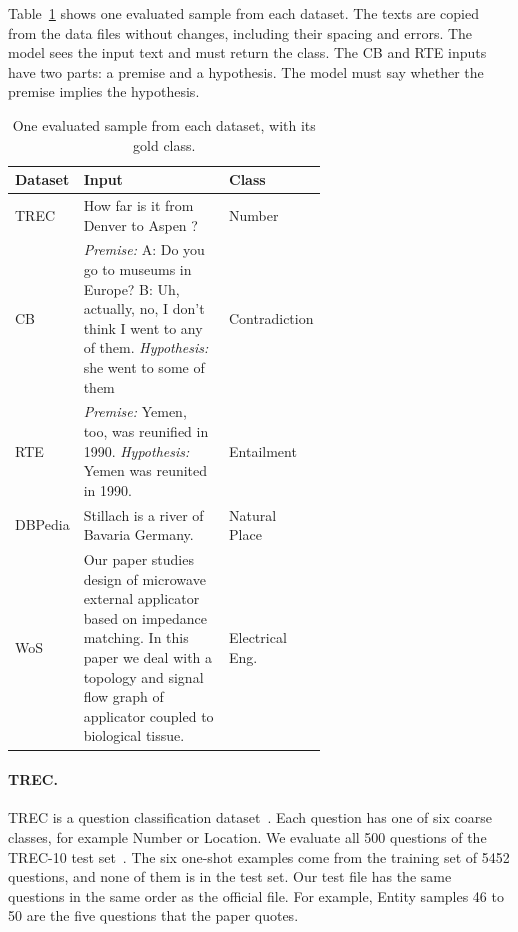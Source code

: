 Table~\ref{tab:examples} shows one evaluated sample from each dataset. The
texts are copied from the data files without changes, including their spacing
and errors. The model sees the input text and must return the class. The CB
and RTE inputs have two parts: a premise and a hypothesis. The model must say
whether the premise implies the hypothesis.

\begin{table}[H]
  \centering
  \small
  \caption{One evaluated sample from each dataset, with its gold class.}
  \label{tab:examples}
  \begin{tabular}{lp{0.62\linewidth}l}
    \toprule
    Dataset & Input & Class \\
    \midrule
    TREC    & How far is it from Denver to Aspen ? & Number \\
    \addlinespace
    CB      & \textit{Premise:} A: Do you go to museums in Europe? B: Uh,
              actually, no, I don't think I went to any of them.\newline
              \textit{Hypothesis:} she went to some of them
            & Contradiction \\
    \addlinespace
    RTE     & \textit{Premise:} Yemen, too, was reunified in 1990.\newline
              \textit{Hypothesis:} Yemen was reunited in 1990.
            & Entailment \\
    \addlinespace
    DBPedia & Stillach is a river of Bavaria Germany. & Natural Place \\
    \addlinespace
    WoS     & Our paper studies design of microwave external applicator based
              on impedance matching. In this paper we deal with a topology and
              signal flow graph of applicator coupled to biological tissue.
            & Electrical Eng. \\
    \bottomrule
  \end{tabular}
\end{table}

\paragraph{TREC.}
TREC is a question classification dataset~\cite{Li:2002}. Each question has
one of six coarse classes, for example Number or Location. We evaluate all 500
questions of the TREC-10 test set~\cite{Voorhees:2000}. The six one-shot
examples come from the training set of 5452 questions, and none of them is in
the test set. Our test file has the same questions in the same order as the
official file. For example, Entity samples 46 to 50 are the five questions that
the paper quotes.

